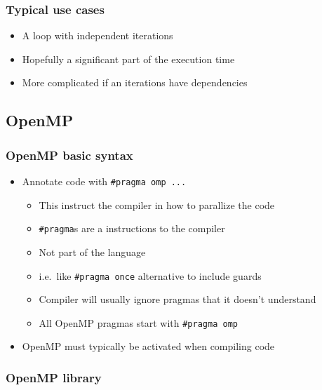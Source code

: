 \subsubsection{Typical use cases}\label{typical-use-cases}

\begin{itemize}
\itemsep1pt\parskip0pt
\item
  A loop with independent iterations
\item
  Hopefully a significant part of the execution time
\item
  More complicated if an iterations have dependencies
\end{itemize}

\subsection{OpenMP}\label{openmp-1}

\subsubsection{OpenMP basic syntax}\label{openmp-basic-syntax}

\begin{itemize}
\itemsep1pt\parskip0pt
\item
  Annotate code with \texttt{\#pragma omp ...}

  \begin{itemize}
  \itemsep1pt\parskip0pt
  \item
    This instruct the compiler in how to parallize the code
  \item
    \texttt{\#pragma}s are a instructions to the compiler
  \item
    Not part of the language
  \item
    i.e.~like \texttt{\#pragma once} alternative to include guards
  \item
    Compiler will usually ignore pragmas that it doesn't understand
  \item
    All OpenMP pragmas start with \texttt{\#pragma omp}
  \end{itemize}
\item
  OpenMP must typically be activated when compiling code
\end{itemize}

\subsubsection{OpenMP library}\label{openmp-library}

